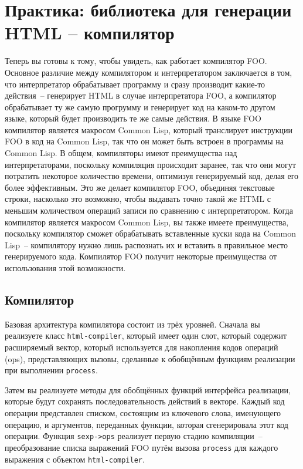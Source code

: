 \chapter{Практика: библиотека для генерации HTML -- компилятор}
\label{ch:31}

Теперь вы готовы к тому, чтобы увидеть, как работает компилятор FOO. Основное различие
между компилятором и интерпретатором заключается в том, что интерпретатор обрабатывает
программу и сразу производит какие-то действия~-- генерирует HTML в случае интерпретатора
FOO, а компилятор обрабатывает ту же самую прогрумму и генерирует код на каком-то другом
языке, который будет производить те же самые действия.  В языке FOO компилятор является
макросом Common Lisp, который транслирует инструкции FOO в код на Common Lisp, так что он
может быть встроен в программы на Common Lisp. В общем, компиляторы имеют преимущества над
интерпретаторами, поскольку компиляция происходит заранее, так что они могут потратить
некоторое количество времени, оптимизуя генерируемый код, делая его более эффективным.  Это
же делает компилятор FOO, объединяя текстовые строки, насколько это возможно, чтобы
выдавать точно такой же HTML с меньшим количеством операций записи по сравнению с
интерпретатором.  Когда компилятор является макросом Common Lisp, вы также имеете
преимущества, поскольку компилятор сможет обрабатывать вставленные куски кода на Common
Lisp~-- компилятору нужно лишь распознать их и вставить в правильное место генерируемого
кода.  Компилятор FOO получит некоторые преимущества от использования этой возможности.

\section{Компилятор}

Базовая архитектура компилятора состоит из трёх уровней.  Сначала вы реализуете класс
\lstinline{html-compiler}, который имеет один слот, который содержит расширяемый вектор, который
используется для накопления кодов операций (ops), представляющих вызовы, сделанные к
обобщённым функциям реализации при выполнении \lstinline{process}.

Затем вы реализуете методы для обобщённых функций интерфейса реализации, которые будут
сохранять последовательность действий в векторе.  Каждый код операции представлен списком,
состоящим из ключевого слова, именующего операцию, и аргументов, переданных функции,
которая сгенерировала этот код операции.  Функция \lstinline{sexp->ops} реализует первую стадию
компиляции~-- преобразование списка выражений FOO путём вызова \lstinline{process} для каждого
выражения с объектом \lstinline{html-compiler}.

